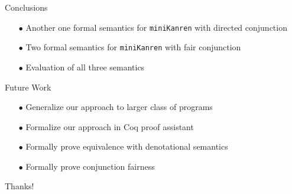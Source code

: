 \documentclass[14pt,aspectratio=169]{beamer}
\newcommand{\mk}{\texttt{miniKanren}\xspace}
\theoremstyle{definition}
\begin{document}
\begin{frame}[fragile]{Conclusions}
\begin{itemize}
     \item[$\bullet$] Another one formal semantics for \mk with directed conjunction
    \vskip5mm
    \item[$\bullet$] Two formal semantics for \mk with fair conjunction
    \vskip5mm
    \item[$\bullet$] Evaluation of all three semantics
\end{itemize}
\end{frame}

\begin{frame}[fragile]{Future Work}
\begin{itemize}
    \item[$\bullet$] Generalize our approach to larger class of programs
    \vskip5mm
    \item[$\bullet$] Formalize our approach in Coq proof assistant
    \vskip5mm
    \item[$\bullet$] Formally prove equivalence with denotational semantics
    \vskip5mm
    \item[$\bullet$] Formally prove conjunction fairness 
\end{itemize}
\end{frame}



\begin{frame}
\begin{center}
{\Huge Thanks!}
\end{center}
\end{frame}
\end{document}

